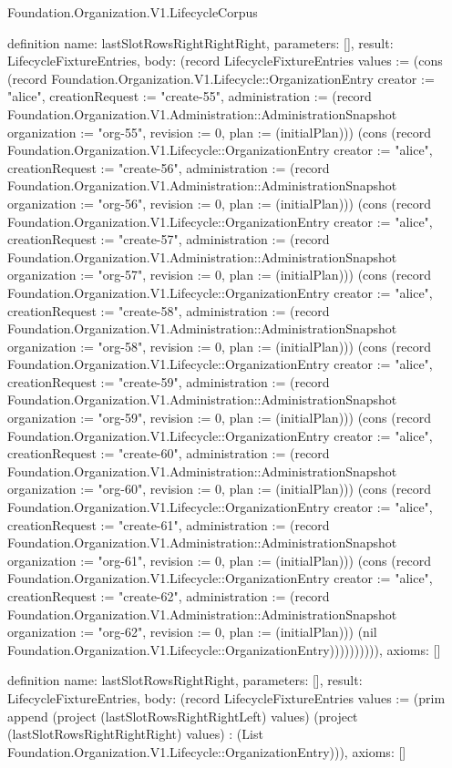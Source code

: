 \begin{lexlean}{Foundation.Organization.V1.LifecycleCorpus}
\begin{semanticmodule}
definition{
  name: lastSlotRowsRightRightRight,
  parameters: [],
  result: LifecycleFixtureEntries,
  body: (record LifecycleFixtureEntries {values := (cons (record Foundation.Organization.V1.Lifecycle::OrganizationEntry {creator := "alice", creationRequest := "create-55", administration := (record Foundation.Organization.V1.Administration::AdministrationSnapshot {organization := "org-55", revision := 0, plan := (initialPlan)})}) (cons (record Foundation.Organization.V1.Lifecycle::OrganizationEntry {creator := "alice", creationRequest := "create-56", administration := (record Foundation.Organization.V1.Administration::AdministrationSnapshot {organization := "org-56", revision := 0, plan := (initialPlan)})}) (cons (record Foundation.Organization.V1.Lifecycle::OrganizationEntry {creator := "alice", creationRequest := "create-57", administration := (record Foundation.Organization.V1.Administration::AdministrationSnapshot {organization := "org-57", revision := 0, plan := (initialPlan)})}) (cons (record Foundation.Organization.V1.Lifecycle::OrganizationEntry {creator := "alice", creationRequest := "create-58", administration := (record Foundation.Organization.V1.Administration::AdministrationSnapshot {organization := "org-58", revision := 0, plan := (initialPlan)})}) (cons (record Foundation.Organization.V1.Lifecycle::OrganizationEntry {creator := "alice", creationRequest := "create-59", administration := (record Foundation.Organization.V1.Administration::AdministrationSnapshot {organization := "org-59", revision := 0, plan := (initialPlan)})}) (cons (record Foundation.Organization.V1.Lifecycle::OrganizationEntry {creator := "alice", creationRequest := "create-60", administration := (record Foundation.Organization.V1.Administration::AdministrationSnapshot {organization := "org-60", revision := 0, plan := (initialPlan)})}) (cons (record Foundation.Organization.V1.Lifecycle::OrganizationEntry {creator := "alice", creationRequest := "create-61", administration := (record Foundation.Organization.V1.Administration::AdministrationSnapshot {organization := "org-61", revision := 0, plan := (initialPlan)})}) (cons (record Foundation.Organization.V1.Lifecycle::OrganizationEntry {creator := "alice", creationRequest := "create-62", administration := (record Foundation.Organization.V1.Administration::AdministrationSnapshot {organization := "org-62", revision := 0, plan := (initialPlan)})}) (nil Foundation.Organization.V1.Lifecycle::OrganizationEntry)))))))))}),
  axioms: []
}

definition{
  name: lastSlotRowsRightRight,
  parameters: [],
  result: LifecycleFixtureEntries,
  body: (record LifecycleFixtureEntries {values := (prim append (project (lastSlotRowsRightRightLeft) values) (project (lastSlotRowsRightRightRight) values) : (List Foundation.Organization.V1.Lifecycle::OrganizationEntry))}),
  axioms: []
}


\end{semanticmodule}
\end{lexlean}
